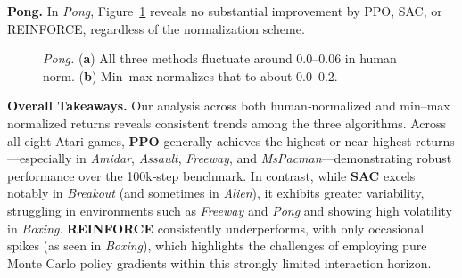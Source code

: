 \noindent \textbf{Pong.} In \emph{Pong}, Figure~\ref{fig:pong_combined} reveals no substantial improvement by PPO, SAC, or REINFORCE, regardless of the normalization scheme.
\begin{figure} 
	\centering
	\quad
	\caption{\emph{Pong.}
		(\textbf{a}) All three methods fluctuate around 0.0--0.06 in human norm.
		(\textbf{b}) Min--max normalizes that to about 0.0--0.2.}
	\label{fig:pong_combined}
\end{figure}

\medskip

\noindent
\textbf{Overall Takeaways.}
Our analysis across both human‐normalized and min--max normalized returns reveals consistent trends among the three algorithms. Across all eight Atari games, \textbf{PPO} generally achieves the highest or near‐highest returns—especially in \emph{Amidar}, \emph{Assault}, \emph{Freeway}, and \emph{MsPacman}—demonstrating robust performance over the 100k‐step benchmark. In contrast, while \textbf{SAC} excels notably in \emph{Breakout} (and sometimes in \emph{Alien}), it exhibits greater variability, struggling in environments such as \emph{Freeway} and \emph{Pong} and showing high volatility in \emph{Boxing}. \textbf{REINFORCE} consistently underperforms, with only occasional spikes (as seen in \emph{Boxing}), which highlights the challenges of employing pure Monte Carlo policy gradients within this strongly limited interaction horizon.

